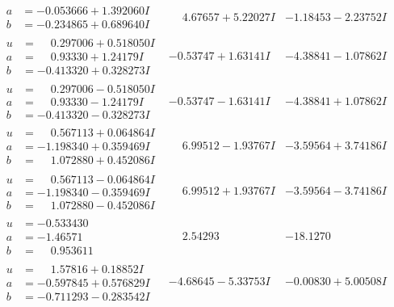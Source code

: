 \documentclass[1p]{elsarticle_modified}
\theoremstyle{definition}
\begin{document}
$$\begin{array}{c|c|c}
\begin{aligned}
a &= -0.053666 + 1.392060 I \\
b &= -0.234865 + 0.689640 I\end{aligned}
 & \phantom{-}4.67657 + 5.22027 I & -1.18453 - 2.23752 I \\ \hline\begin{aligned}
u &= \phantom{-}0.297006 + 0.518050 I \\
a &= \phantom{-}0.93330 + 1.24179 I \\
b &= -0.413320 + 0.328273 I\end{aligned}
 & -0.53747 + 1.63141 I & -4.38841 - 1.07862 I \\ \hline\begin{aligned}
u &= \phantom{-}0.297006 - 0.518050 I \\
a &= \phantom{-}0.93330 - 1.24179 I \\
b &= -0.413320 - 0.328273 I\end{aligned}
 & -0.53747 - 1.63141 I & -4.38841 + 1.07862 I \\ \hline\begin{aligned}
u &= \phantom{-}0.567113 + 0.064864 I \\
a &= -1.198340 + 0.359469 I \\
b &= \phantom{-}1.072880 + 0.452086 I\end{aligned}
 & \phantom{-}6.99512 - 1.93767 I & -3.59564 + 3.74186 I \\ \hline\begin{aligned}
u &= \phantom{-}0.567113 - 0.064864 I \\
a &= -1.198340 - 0.359469 I \\
b &= \phantom{-}1.072880 - 0.452086 I\end{aligned}
 & \phantom{-}6.99512 + 1.93767 I & -3.59564 - 3.74186 I \\ \hline\begin{aligned}
u &= -0.533430\phantom{ +0.000000I} \\
a &= -1.46571\phantom{ +0.000000I} \\
b &= \phantom{-}0.953611\phantom{ +0.000000I}\end{aligned}
 & \phantom{-}2.54293\phantom{ +0.000000I} & -18.1270\phantom{ +0.000000I} \\ \hline\begin{aligned}
u &= \phantom{-}1.57816 + 0.18852 I \\
a &= -0.597845 + 0.576829 I \\
b &= -0.711293 - 0.283542 I\end{aligned}
 & -4.68645 - 5.33753 I & -0.00830 + 5.00508 I \\ \hline\begin{aligned}

\end{aligned}
\end{array}$$
\end{document}
